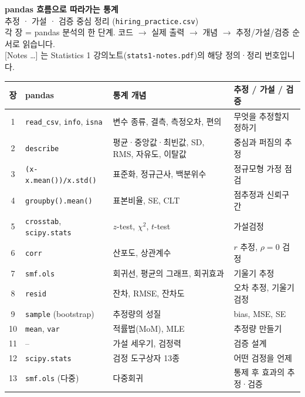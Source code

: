 \documentclass[11pt,a4paper]{article}
\newcommand{\code}[1]{\texttt{#1}}
\newcommand{\nref}[1]{{\footnotesize\textsf{\color{blue!55!black}[Notes #1]}}}
\begin{document}
\begin{center}
{\LARGE\textbf{pandas 흐름으로 따라가는 통계}}\\[0.4em]
{\large 추정 · 가설 · 검증 중심 정리 (\code{hiring\_practice.csv})}\\[0.3em]
{\small 각 장 = pandas 분석의 한 단계. 코드 $\to$ 실제 출력 $\to$ 개념 $\to$ 추정/가설/검증 순서로 읽습니다.\\
\nref{\dots} 는 Statistics 1 강의노트(\code{stats1-notes.pdf})의 해당 정의·정리 번호입니다.}
\end{center}

\vspace{0.5em}
\begin{center}\small
\begin{tabular}{@{}c l l l@{}}
\toprule
장 & pandas & 통계 개념 & 추정 / 가설 / 검증 \\
\midrule
1 & \code{read\_csv}, \code{info}, \code{isna} & 변수 종류, 결측, 측정오차, 편의 & 무엇을 추정할지 정하기 \\
2 & \code{describe} & 평균·중앙값·최빈값, SD, RMS, 자유도, 이탈값 & 중심과 퍼짐의 추정 \\
3 & \code{(x-x.mean())/x.std()} & 표준화, 정규근사, 백분위수 & 정규모형 가정 점검 \\
4 & \code{groupby().mean()} & 표본비율, SE, CLT & 점추정과 신뢰구간 \\
5 & \code{crosstab}, \code{scipy.stats} & $z$-test, $\chi^2$, $t$-test & 가설검정 \\
6 & \code{corr} & 산포도, 상관계수 & $r$ 추정, $\rho=0$ 검정 \\
7 & \code{smf.ols} & 회귀선, 평균의 그래프, 회귀효과 & 기울기 추정 \\
8 & \code{resid} & 잔차, RMSE, 잔차도 & 오차 추정, 기울기 검정 \\
\midrule
9 & \code{sample} (bootstrap) & 추정량의 성질 & bias, MSE, SE \\
10 & \code{mean}, \code{var} & 적률법(MoM), MLE & 추정량 만들기 \\
11 & -- & 가설 세우기, 검정력 & 검증 설계 \\
12 & \code{scipy.stats} & 검정 도구상자 13종 & 어떤 검정을 언제 \\
13 & \code{smf.ols} (다중) & 다중회귀 & 통제 후 효과의 추정·검증 \\
\bottomrule
\end{tabular}
\end{center}
\end{document}
